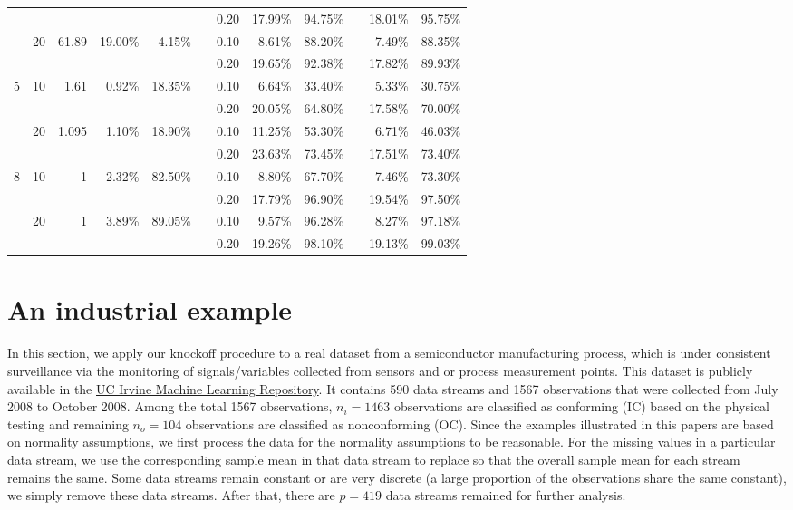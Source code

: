 \documentclass[]{interact}
\theoremstyle{plain}%
\theoremstyle{definition}
\theoremstyle{remark}
\begin{document}
\begin{table}[htbp]
\begin{tabular}{ccrrrrrrrrrr}
      &   &   &   &   &   &             0.20  & 17.99\% & 94.75\% &   & 18.01\% & 95.75\% \\
      & 20 &           61.89  & 19.00\% & 4.15\% &   &             0.10  & 8.61\% & 88.20\% &   & 7.49\% & 88.35\% \\
      &   &   &   &   &   &             0.20  & 19.65\% & 92.38\% &   & 17.82\% & 89.93\% \\
    5 & 10 & 1.61 & 0.92\% & 18.35\% &   &             0.10  & 6.64\% & 33.40\% &   & 5.33\% & 30.75\% \\
      &   &   &   &   &   &             0.20  & 20.05\% & 64.80\% &   & 17.58\% & 70.00\% \\
      & 20 & 1.095 & 1.10\% & 18.90\% &   &             0.10  & 11.25\% & 53.30\% &   & 6.71\% & 46.03\% \\
      &   &   &   &   &   &             0.20  & 23.63\% & 73.45\% &   & 17.51\% & 73.40\% \\
    8 & 10 & 1 & 2.32\% & 82.50\% &   &             0.10  & 8.80\% & 67.70\% &   & 7.46\% & 73.30\% \\
      &   &   &   &   &   &             0.20  & 17.79\% & 96.90\% &   & 19.54\% & 97.50\% \\
      & 20 & 1 & 3.89\% & 89.05\% &   &             0.10  & 9.57\% & 96.28\% &   & 8.27\% & 97.18\% \\
      &   &   &   &   &   &             0.20  & 19.26\% & 98.10\% &   & 19.13\% & 99.03\% \\
      \bottomrule
    \end{tabular}%
  \label{tab:addlabel}%
\end{table}%

\section{An industrial example}


In this section, we apply our knockoff procedure to a real dataset from a semiconductor manufacturing process, which is under consistent surveillance via the monitoring of signals/variables collected from sensors and or process measurement points. This dataset is publicly available in the \href{http://archive.ics.uci.edu/ml/datasets/SECOM}{UC Irvine Machine Learning Repository}. It contains 590 data streams and 1567 observations that were collected from July 2008 to October 2008. Among the total 1567 observations, $n_i=1463$ observations are classified as conforming (IC) based on the physical testing and remaining $n_o=104$ observations are classified as nonconforming (OC). Since the examples illustrated in this papers are based on normality assumptions, we first process the data for the normality assumptions to be reasonable. For the missing values in a particular data stream, we use the corresponding sample mean in that data stream to replace so that the overall sample mean for each stream remains the same. Some data streams remain constant or are very discrete (a large proportion of the observations share the same constant), we simply remove these data streams. After that, there are $p=419$ data streams remained for further analysis. 
\end{document}
